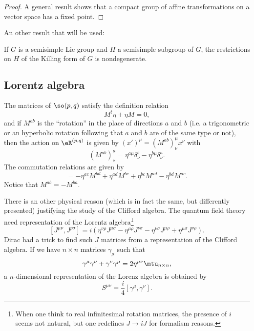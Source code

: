 \begin{proof}
A general result shows that a compact group of affine transformations on a vector space has a fixed point.

\end{proof}

An other result that will be used:
\begin{lemma}		\label{lem:Killing_ss_descent}
If $G$ is a semisimple Lie group and $H$ a semisimple subgroup of $G$, the restrictions on $H$ of the Killing form of $G$ is nondegenerate.
\end{lemma}

\subsection{Lorentz algebra}

\begin{lemma}     \label{LemCommsopqAlg}
The matrices of $\so(p,q)$ satisfy the definition relation
\begin{equation}
    M^t\eta+\eta M=0,
\end{equation}
and if $M^{ab}$ is the ``rotation'' in the place of directions $a$ and $b$ (i.e. a trigonometric or an hyperbolic rotation following that $a$ and $b$ are of the same type or not), then the action on $\eR^{(p,q)}$ is given by $(x')^{\mu}=(M^{ab})^{\mu}_{\nu}x^{\nu}$ with
\begin{equation}
    (M^{ab})^{\mu}_{\nu}=\eta^{a\mu}\delta^b_{\nu}-\eta^{b\mu}\delta^a_{\nu}.
\end{equation}
The commutation relations are given by
\begin{equation}
    [M^{ab},M^{cd}]=-\eta^{ac}M^{bd}+\eta^{ad}M^{bc}+\eta^{bc}M^{ad}-\eta^{bd}M^{ac}.
\end{equation}
Notice that $M^{ab}=-M^{ba}$.
\end{lemma}

There is an other physical reason (which is in fact the same, but differently presented) justifying the study of the Clifford algebra. The quantum field theory need representation of the Lorentz algebra\footnote{When one think to real infinitesimal rotation matrices, the presence of $i$ seems not natural, but one redefines $J\to iJ$ for formalism reasons.}
\[
 [J^{\mu\nu},J^{\rho\sigma}]=i(\eta^{\nu\rho}J^{\mu\sigma}-\eta^{\mu\rho}J^{\nu\sigma}
 -\eta^{\nu\sigma}J^{\mu\rho}+\eta^{\mu\sigma}J^{\nu\rho}).
\]
Dirac had a trick to find such $J$ matrices from a representation of the Clifford algebra. If we have $n\times n$ matrices $\gamma_{\mu}$ such that
\[
    \gamma^{\mu}\gamma^{\nu}+\gamma^{\nu}\gamma^{\mu}=2\eta^{\mu\nu}\mtu_{n\times n},
\]
a $n$-dimensional representation of the Lorenz algebra is obtained by
\[
    S^{\mu\nu}=\frac{i}{4}\left[\gamma^{\mu},\gamma^{\nu}\right].
\]

